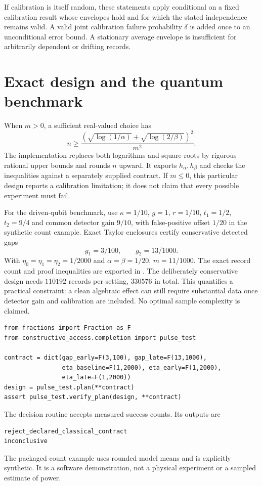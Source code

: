 If calibration is itself random, these statements apply conditional on a
fixed calibration result whose envelopes hold and for which the stated
independence remains valid. A valid joint calibration failure probability
$\delta$ is added once to an unconditional error bound. A stationary average
envelope is insufficient for arbitrarily dependent or drifting records.

\section{Exact design and the quantum benchmark}
When $m>0$, a sufficient real-valued choice has
\[
 n\geq\frac{(\sqrt{\log(1/\alpha)}+
                  \sqrt{\log(2/\beta)})^2}{m^2}.
\]
The implementation replaces both logarithms and square roots by rigorous
rational upper bounds and rounds $n$ upward. It exports $h_\alpha,h_\beta$
and checks the inequalities against a separately supplied contract. If
$m\leq0$, this particular design reports a calibration limitation; it does
not claim that every possible experiment must fail.

For the driven-qubit benchmark, use $\kappa=1/10$, $g=1$, $r=1/10$,
$t_1=1/2$, $t_2=9/4$ and common detector gain $9/10$, with false-positive
offset $1/20$ in the synthetic count example. Exact Taylor enclosures
certify conservative detected gaps
\[
 g_1=3/100,\qquad g_2=13/1000.
\]
With $\eta_0=\eta_1=\eta_2=1/2000$ and $\alpha=\beta=1/20$,
$m=11/1000$. The exact record count and proof inequalities are exported in
. The deliberately conservative
design needs $110192$ records per setting, $330576$ in total. This quantifies a
practical constraint: a clean algebraic effect can still require substantial
data once detector gain and calibration are included. No optimal sample
complexity is claimed.

\begin{verbatim}
from fractions import Fraction as F
from constructive_access.completion import pulse_test

contract = dict(gap_early=F(3,100), gap_late=F(13,1000),
                eta_baseline=F(1,2000), eta_early=F(1,2000),
                eta_late=F(1,2000))
design = pulse_test.plan(**contract)
assert pulse_test.verify_plan(design, **contract)
\end{verbatim}

The decision routine accepts measured success counts. Its outputs are
\begin{verbatim}
reject_declared_classical_contract
inconclusive
\end{verbatim}
The packaged count example uses rounded model means
and is explicitly synthetic. It is a software demonstration, not a physical
experiment or a sampled estimate of power.


